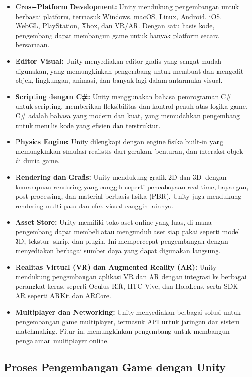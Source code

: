 \begin{itemize}
    \item \textbf{Cross-Platform Development:} Unity mendukung pengembangan untuk berbagai platform, termasuk Windows, macOS, Linux, Android, iOS, WebGL, PlayStation, Xbox, dan VR/AR. Dengan satu basis kode, pengembang dapat membangun game untuk banyak platform secara bersamaan.
    \item \textbf{Editor Visual:} Unity menyediakan editor grafis yang sangat mudah digunakan, yang memungkinkan pengembang untuk membuat dan mengedit objek, lingkungan, animasi, dan banyak lagi dalam antarmuka visual.
    \item \textbf{Scripting dengan C\#:} Unity menggunakan bahasa pemrograman C\# untuk scripting, memberikan fleksibilitas dan kontrol penuh atas logika game. C\# adalah bahasa yang modern dan kuat, yang memudahkan pengembang untuk menulis kode yang efisien dan terstruktur.
    \item \textbf{Physics Engine:} Unity dilengkapi dengan engine fisika built-in yang memungkinkan simulasi realistis dari gerakan, benturan, dan interaksi objek di dunia game.
    \item \textbf{Rendering dan Grafis:} Unity mendukung grafik 2D dan 3D, dengan kemampuan rendering yang canggih seperti pencahayaan real-time, bayangan, post-processing, dan material berbasis fisika (PBR). Unity juga mendukung rendering multi-pass dan efek visual canggih lainnya.
    \item \textbf{Asset Store:} Unity memiliki toko aset online yang luas, di mana pengembang dapat membeli atau mengunduh aset siap pakai seperti model 3D, tekstur, skrip, dan plugin. Ini mempercepat pengembangan dengan menyediakan berbagai sumber daya yang dapat digunakan langsung.
    \item \textbf{Realitas Virtual (VR) dan Augmented Reality (AR):} Unity mendukung pengembangan aplikasi VR dan AR dengan integrasi ke berbagai perangkat keras, seperti Oculus Rift, HTC Vive, dan HoloLens, serta SDK AR seperti ARKit dan ARCore.
    \item \textbf{Multiplayer dan Networking:} Unity menyediakan berbagai solusi untuk pengembangan game multiplayer, termasuk API untuk jaringan dan sistem matchmaking. Fitur ini memungkinkan pengembang untuk membangun pengalaman multiplayer online.
\end{itemize}

\subsection{Proses Pengembangan Game dengan Unity}
\label{subsec:proses_pengembangan}

